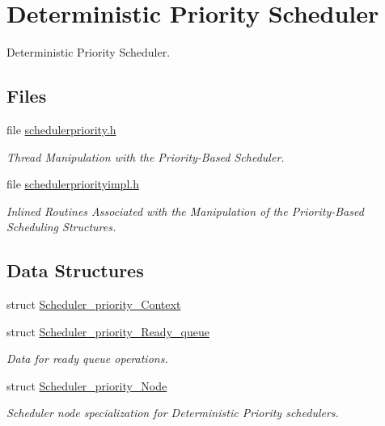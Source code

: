 \hypertarget{group__RTEMSScoreSchedulerDPS}{}\section{Deterministic Priority Scheduler}
\label{group__RTEMSScoreSchedulerDPS}


Deterministic Priority Scheduler.  


\subsection*{Files}
\begin{DoxyCompactItemize}
\item 
file \mbox{\hyperlink{schedulerpriority_8h}{schedulerpriority.\+h}}
\begin{DoxyCompactList}\small\item\em Thread Manipulation with the Priority-\/\+Based Scheduler. \end{DoxyCompactList}\item 
file \mbox{\hyperlink{schedulerpriorityimpl_8h}{schedulerpriorityimpl.\+h}}
\begin{DoxyCompactList}\small\item\em Inlined Routines Associated with the Manipulation of the Priority-\/\+Based Scheduling Structures. \end{DoxyCompactList}\end{DoxyCompactItemize}
\subsection*{Data Structures}
\begin{DoxyCompactItemize}
\item 
struct \mbox{\hyperlink{structScheduler__priority__Context}{Scheduler\+\_\+priority\+\_\+\+Context}}
\item 
struct \mbox{\hyperlink{structScheduler__priority__Ready__queue}{Scheduler\+\_\+priority\+\_\+\+Ready\+\_\+queue}}
\begin{DoxyCompactList}\small\item\em Data for ready queue operations. \end{DoxyCompactList}\item 
struct \mbox{\hyperlink{structScheduler__priority__Node}{Scheduler\+\_\+priority\+\_\+\+Node}}
\begin{DoxyCompactList}\small\item\em Scheduler node specialization for Deterministic Priority schedulers. \end{DoxyCompactList}\end{DoxyCompactItemize}
